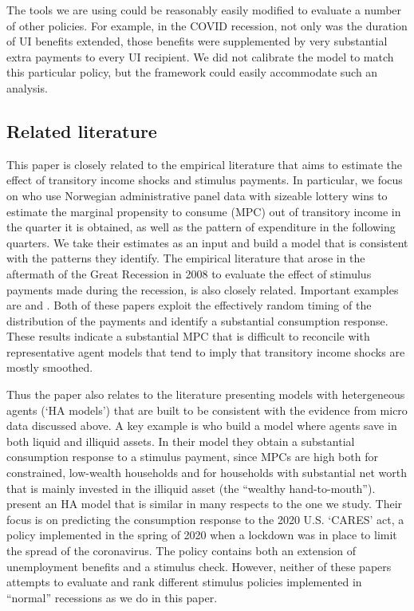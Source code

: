 \documentclass[../HAFiscal]{subfiles}
\begin{document}
The tools we are using could be reasonably easily modified to evaluate a number of other policies.  For example, in the COVID recession, not only was the duration of UI benefits extended, those benefits were supplemented by very substantial extra payments to every UI recipient.  We did not calibrate the model to match this particular policy, but the framework could easily accommodate such an analysis.

\subsection{Related literature}
\label{sec:lit}

This paper is closely related to the empirical literature that aims to estimate the effect of transitory income shocks and stimulus payments. In particular, we focus on \cite{fagereng_mpc_2021} who use Norwegian administrative panel data with sizeable lottery wins to estimate the marginal propensity to consume (MPC) out of transitory income in the quarter it is obtained, as well as the pattern of expenditure in the following quarters. We take their estimates as an input and build a model that is consistent with the patterns they identify. The empirical literature that arose in the aftermath of the Great Recession in 2008 to evaluate the effect of stimulus payments made during the recession, is also closely related. Important examples are \cite{parker2013consumer} and \cite{broda2014economic}. Both of these papers exploit the effectively random timing of the distribution of the payments and identify a substantial consumption response. These results indicate a substantial MPC that is difficult to reconcile with representative agent models that tend to imply that transitory income shocks are mostly smoothed. 

Thus the paper also relates to the literature presenting models with hetergeneous agents (`HA models') that are built to be consistent with the evidence from micro data discussed above. A key example is \cite{kaplan2014model} who build a model where agents save in both liquid and illiquid assets. In their model they obtain a substantial consumption response to a stimulus payment, since MPCs are high both for constrained, low-wealth households and for households with substantial net worth that is mainly invested in the illiquid asset (the ``wealthy hand-to-mouth''). \cite{carroll2020modeling} present an HA model that is similar in many respects to the one we study. Their focus is on predicting the consumption response to the 2020 U.S. `CARES' act, a policy implemented in the spring of 2020 when a lockdown was in place to limit the spread of the coronavirus. The policy contains both an extension of unemployment benefits and a stimulus check. However, neither of these papers attempts to evaluate and rank different stimulus policies implemented in ``normal'' recessions as we do in this paper. 
\end{document}
